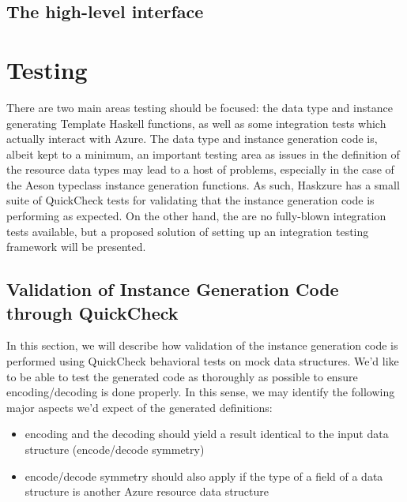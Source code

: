 \documentclass[11pt]{report}
\begin{document}
\section{The high-level interface} %

\chapter{Testing}

There are two main areas testing should be focused: the data type and instance
generating Template Haskell functions, as well as some integration tests
which actually interact with Azure. \newline
The data type and instance generation code is, albeit kept to a minimum, an
important testing area as issues in the definition of the resource data types
may lead to a host of problems, especially in the case of the Aeson typeclass
instance generation functions. As such, Haskzure has a small suite of QuickCheck
tests for validating that the instance generation code is performing as
expected. \newline
On the other hand, the are no fully-blown integration tests available, but a
proposed solution of setting up an integration testing framework will be
presented.

\section{Validation of Instance Generation Code through QuickCheck}

In this section, we will describe how validation of the instance generation
code is performed using QuickCheck behavioral tests on mock data structures.
We'd like to be able to test the generated code as thoroughly as
possible to ensure encoding/decoding is done properly. In this sense, we may
identify the following major aspects we'd expect of the generated definitions:

\begin{itemize}
    \item{} encoding and the decoding should yield a result identical to the
        input data structure (encode/decode symmetry)
    \item{} encode/decode symmetry should also apply if the type of a field of
        a data structure is another Azure resource data structure
\end{itemize}
\end{document}
